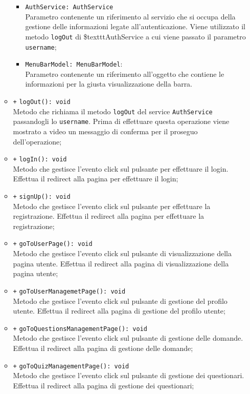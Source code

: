\begin{itemize}
\begin{itemize}
\begin{itemize}
			\item \texttt{AuthService: AuthService} \\
			Parametro contenente un riferimento al servizio che si occupa della gestione delle informazioni legate all'autenticazione.  Viene utilizzato il metodo \texttt{logOut} di \$texttt{AuthService} a cui viene passato il parametro \texttt{username};
			\item \texttt{MenuBarModel: MenuBarModel}: \\
			Parametro contenente un riferimento all'oggetto che contiene le informazioni per la giusta visualizzazione della barra.
		\end{itemize}
		\item \texttt{+} \texttt{logOut(): void} \\
		Metodo che richiama il metodo \texttt{logOut} del service \texttt{AuthService} passandogli lo \texttt{username}. Prima di effettuare questa operazione viene mostrato a video un messaggio di conferma per il proseguo dell'operazione; 
		\item \texttt{+} \texttt{logIn(): void} \\
		Metodo che gestisce l'evento click sul pulsante per effettuare il login. Effettua il redirect alla pagina per effettuare il login; 
		\item \texttt{+} \texttt{signUp(): void} \\
		Metodo che gestisce l'evento click sul pulsante per effettuare la registrazione. Effettua il redirect alla pagina per effettuare la registrazione; 
		\item \texttt{+} \texttt{goToUserPage(): void} \\
		Metodo che gestisce l'evento click sul pulsante di visualizzazione della pagina utente. Effettua il redirect alla pagina di visualizzazione della pagina utente; 
		\item \texttt{+} \texttt{goToUserManagemetPage(): void} \\
		Metodo che gestisce l'evento click sul pulsante di gestione del profilo utente. Effettua il redirect alla pagina di gestione del profilo utente; 
		\item \texttt{+} \texttt{goToQuestionsManagementPage(): void} \\
		Metodo che gestisce l'evento click sul pulsante di gestione delle domande. Effettua il redirect alla pagina di gestione delle domande; 
		\item \texttt{+} \texttt{goToQuizManagementPage(): void} \\
		Metodo che gestisce l'evento click sul pulsante di gestione dei questionari. Effettua il redirect alla pagina di gestione dei questionari;

\end{itemize}
\end{itemize}
